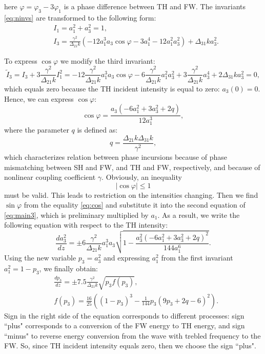 \documentclass[a4paper, 12pt, onecolumn]{extarticle}
\begin{document}
here \(\varphi=\varphi_3-3\varphi_1\) is a phase difference between TH and FW. The invariants  \eqref{eq:ninvs} are transformed to the following form:
\[
\begin{aligned}
&I_1=a_1^2+a_3^2=1,\\
&I_3=\frac{\gamma^2}{\Delta_{21}k}\left(-12a_1^3a_3\cos\varphi-3a_1^4-12a_1^2a_3^2\right)+\Delta_{31}ka_3^2.
\end{aligned}
\] 

To express \(\cos \varphi\) we modify the third invariant:
\[
\tilde{I}_3=I_3+3\frac{\gamma^2}{\Delta_{21}k}I_1^2=-12\frac{\gamma^2}{\Delta_{21}k}a_1^3a_3\cos\varphi-6\frac{\gamma^2}{\Delta_{21}k}a_1^2a_3^2+3\frac{\gamma^2}{\Delta_{21}k}a_3^4+2\Delta_{31}ka_3^2=0,
\]
which equals zero because the TH incident intensity is equal to zero: \(a_3(0)=0\). Hence, we can express \(\cos \varphi\):
\begin{equation}
\label{eq:cos}
\cos\varphi=\frac{a_3(-6a_1^2+3a_3^2+2q)}{12a_1^3},
\end{equation}
where the parameter $q$ is defined as:
$$
q=\frac{\Delta_{21}k\Delta_{31}k}{\gamma^2},
$$
which characterizes relation between phase incursions because of phase mismatching between SH and FW, and TH and FW, respectively, and because of nonlinear coupling coefficient ${\gamma}$.
Obviously, an inequality 
\[
|\cos\varphi|\le1
\]
must be valid. This leads to restriction on the intensities changing.
Then we find \(\sin \varphi\) from the equality \eqref{eq:cos} and substitute it into the second equation of \eqref{eq:main3}, which is preliminary multiplied by \(a_1\). As a result, we write the following equation with respect to the TH intensity:
\[\frac{da_3^2}{dz}=\pm6\frac{\gamma^2}{\Delta_{21}k}a_1^3a_3\sqrt{1-\frac{a_3^2(-6a_1^2+3a_3^2+2q)^2}{144a_1^6}}.\]
Using the new variable \(p_3=a_3^2\) and expressing \(a_1^2\) from the first invariant \(a_1^2=1-p_3\), we finally obtain:
\begin{equation}
\label{eq:main4}
\begin{aligned}
&\frac{dp_3}{dz}=\pm7.5\frac{\gamma^2}{\Delta_{21}k}\sqrt{p_3f(p_3)},\\
&f(p_3)=\frac{16}{25}((1-p_3)^3-\frac{1}{144}p_3(9p_3+2q-6)^2).
\end{aligned}
\end{equation}
Sign in the right side of the equation corresponds to different processes: sign ``plus" corresponds to a conversion of the FW energy to TH energy, and sign ``minus" to reverse energy conversion from the wave with trebled frequency to the FW. So, since TH incident intensity equals zero, then we choose the sign ``plus".
\end{document}
